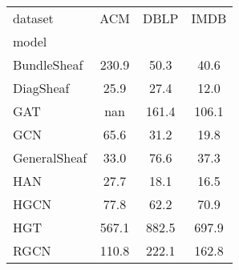 \begin{tabular}{lSSS}
\toprule
{dataset} & {ACM} & {DBLP} & {IMDB} \\
{model} & {} & {} & {} \\
\midrule
BundleSheaf & 230.9 & 50.3 & 40.6 \\
DiagSheaf & 25.9 & 27.4 & 12.0 \\
GAT & nan & 161.4 & 106.1 \\
GCN & 65.6 & 31.2 & 19.8 \\
GeneralSheaf & 33.0 & 76.6 & 37.3 \\
HAN & 27.7 & 18.1 & 16.5 \\
HGCN & 77.8 & 62.2 & 70.9 \\
HGT & 567.1 & 882.5 & 697.9 \\
RGCN & 110.8 & 222.1 & 162.8 \\
\bottomrule
\end{tabular}
